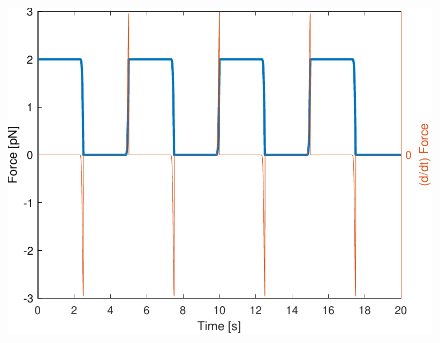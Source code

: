 \begin{figure}[t!]
	\centering
	\includegraphics[width=0.95\linewidth]{../code/figs/square_regularized}
	\caption{}
	\label{fig:squareregularized}
\end{figure}



